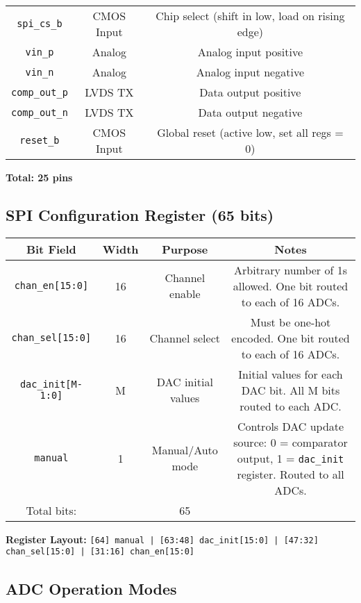 \documentclass{article}
\begin{document}
\begin{table}[h!]
\begin{tabular}{ccc}
\texttt{spi\_cs\_b} & CMOS Input & Chip select (shift in low, load on rising edge) \\
\texttt{vin\_p} & Analog & Analog input positive \\
\texttt{vin\_n} & Analog & Analog input negative \\
\texttt{comp\_out\_p} & LVDS TX & Data output positive \\
\texttt{comp\_out\_n} & LVDS TX & Data output negative \\
\texttt{reset\_b} & CMOS Input & Global reset (active low, set all regs = 0) \\
\bottomrule
\end{tabular}
\end{table}

\textbf{Total: 25 pins}

\subsection{SPI Configuration Register (65
bits)}\label{spi-configuration-register-65-bits}

\begin{table}[h!]
\centering
\begin{tabular}{cccc}
\toprule
Bit Field & Width & Purpose & Notes \\
\midrule
\texttt{chan\_en[15:0]} & 16 & Channel enable & Arbitrary number of 1s allowed. One bit routed to each of 16 ADCs. \\
\texttt{chan\_sel[15:0]} & 16 & Channel select & Must be one-hot encoded. One bit routed to each of 16 ADCs. \\
\texttt{dac\_init[M-1:0]} & M & DAC initial values & Initial values for each DAC bit. All M bits routed to each ADC. \\
\texttt{manual} & 1 & Manual/Auto mode & Controls DAC update source: 0 = comparator output, 1 = \texttt{dac\_init} register. Routed to all ADCs. \\
Total bits: &  & 65 &  \\
\bottomrule
\end{tabular}
\end{table}

\textbf{Register Layout:}
\texttt{[64] manual | [63:48] dac\_init[15:0] | [47:32] chan\_sel[15:0] | [31:16] chan\_en[15:0]}

\subsection{ADC Operation Modes}\label{adc-operation-modes}
\end{document}
